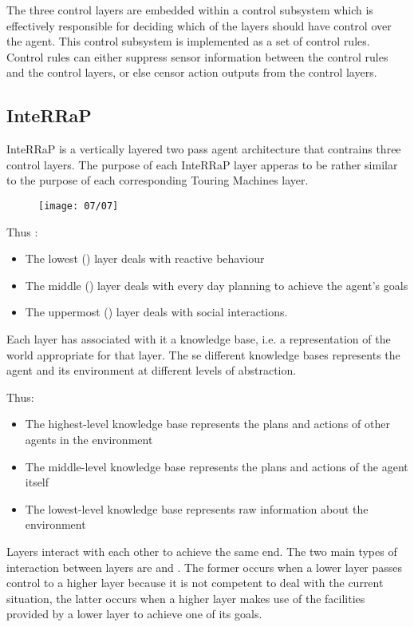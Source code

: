 The three control layers are embedded within a control subsystem which is effectively responsible for deciding which of the layers should have control over the agent. This control subsystem is implemented as a set of control rules.\\
Control rules can either suppress sensor information between the control rules and the control layers, or else censor action outputs from the control layers.

\subsection{InteRRaP}
InteRRaP is a vertically layered two pass agent architecture that contrains three control layers.
The purpose of each InteRRaP layer apperas to be rather similar to the purpose of each corresponding Touring Machines layer.

\begin{figure}[!h]
\centering
\texttt{[image: 07/07]}
\end{figure}

Thus :
\begin{itemize}
\item The lowest () layer deals with reactive behaviour
\item The middle () layer deals with every day planning to achieve the agent's goals
\item The uppermost () layer deals with social interactions.
\end{itemize}
Each layer has associated with it a knowledge base, i.e. a representation of the world appropriate for that layer. The se different knowledge bases represents the agent and its environment at different levels of abstraction.

Thus:
\begin{itemize}
\item The highest-level knowledge base represents the plans and actions of other agents in the environment
\item The middle-level knowledge base represents the plans and actions of the agent itself
\item The lowest-level knowledge base represents raw information about the environment
\end{itemize}
Layers interact with each other to achieve the same end. The two main types of interaction between layers are  and . The former occurs when a lower layer passes control to a higher layer because it is not competent to deal with the current situation, the latter occurs when a higher layer makes use of the facilities provided by a lower layer to achieve one of its goals.

